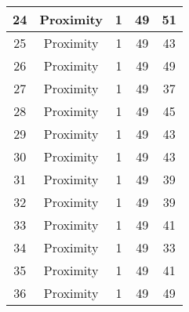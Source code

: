 \documentclass[results.tex]{subfiles}
\begin{document}
\begin{center}
\begin{tabular}{| c || c | c | c | c |}
            \hline
            24                      & Proximity                    & 1                      & 49                      & 51                   \\
            \hline
            25                      & Proximity                    & 1                      & 49                      & 43                   \\
            \hline
            26                      & Proximity                    & 1                      & 49                      & 49                   \\
            \hline
            27                      & Proximity                    & 1                      & 49                      & 37                   \\
            \hline
            28                      & Proximity                    & 1                      & 49                      & 45                   \\
            \hline
            29                      & Proximity                    & 1                      & 49                      & 43                   \\
            \hline
            30                      & Proximity                    & 1                      & 49                      & 43                   \\
            \hline
            31                      & Proximity                    & 1                      & 49                      & 39                   \\
            \hline
            32                      & Proximity                    & 1                      & 49                      & 39                   \\
            \hline
            33                      & Proximity                    & 1                      & 49                      & 41                   \\
            \hline
            34                      & Proximity                    & 1                      & 49                      & 33                   \\
            \hline
            35                      & Proximity                    & 1                      & 49                      & 41                   \\
            \hline
            36                      & Proximity                    & 1                      & 49                      & 49                   \\

\end{tabular}
\end{center}
\end{document}
